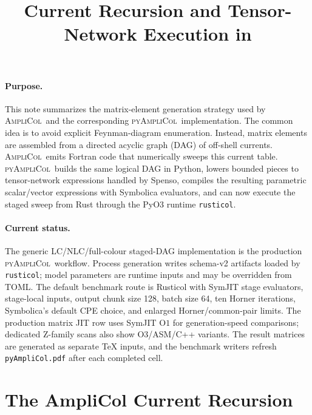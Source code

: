 \documentclass[10pt]{article}
\title{\vspace{-2.0em}Current Recursion and Tensor-Network Execution in \PAC}
\author{}
\date{\vspace{-3.0em}}
\newcommand{\AC}{\textsc{AmpliCol}}
\newcommand{\PAC}{\textsc{pyAmpliCol}}
\begin{document}
\maketitle
\vspace{-1.2em}

\paragraph{Purpose.}
This note summarizes the matrix-element generation strategy used by \AC\ and
the corresponding \PAC\ implementation.  The common idea is to avoid explicit
Feynman-diagram enumeration.  Instead, matrix elements are assembled from a
directed acyclic graph (DAG) of off-shell currents.  \AC\ emits Fortran code
that numerically sweeps this current table.  \PAC\ builds the same logical DAG
in Python, lowers bounded pieces to tensor-network expressions handled by
Spenso, compiles the resulting parametric scalar/vector expressions with
Symbolica evaluators, and can now execute the staged sweep from Rust through
the PyO3 runtime \texttt{rusticol}.

\paragraph{Current status.}
The generic LC/NLC/full-colour staged-DAG implementation is the production
\PAC\ workflow.  Process generation writes schema-v2 artifacts loaded by
\texttt{rusticol}; model parameters are runtime inputs and may be overridden
from TOML.  The default benchmark route is Rusticol with SymJIT stage
evaluators, stage-local inputs, output chunk size 128, batch size 64, ten
Horner iterations, Symbolica's default CPE choice, and enlarged
Horner/common-pair limits.  The production matrix JIT row uses SymJIT
\(\mathrm{O}1\) for generation-speed comparisons; dedicated Z-family scans
also show O3/ASM/C++ variants.  The result matrices are generated as separate
\TeX{} inputs, and the benchmark writers refresh \texttt{pyAmpliCol.pdf}
after each completed cell.

\section{The AmpliCol Current Recursion}
\end{document}
